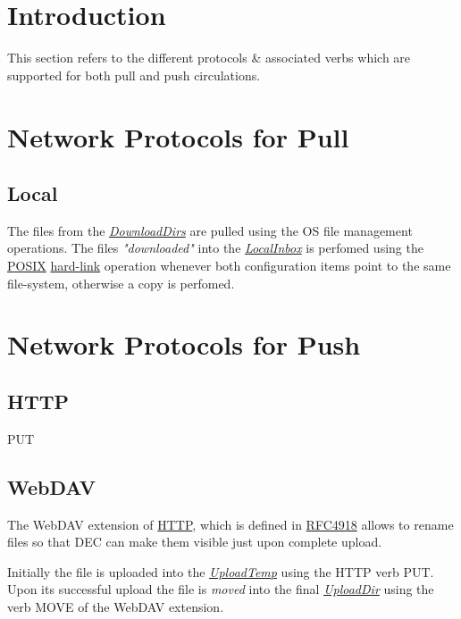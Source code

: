 \documentclass[dec_sum_main.tex]{subfiles}
\begin{document}
\section{Introduction}
This section refers to the different protocols \& associated verbs which are supported for both pull and push circulations.


\section{Network Protocols for Pull}

\subsection{Local}
The files from the \hyperref[DownloadDirs]{\textit{DownloadDirs}} are 
pulled using the OS file management operations. 
The files \textit{"downloaded"} into the \hyperref[LocalInbox]{\textit{LocalInbox}} is perfomed using the \hyperlink{https://en.wikipedia.org/wiki/POSIX}{POSIX} \hyperlink{https://en.wikipedia.org/wiki/Hard_link}{hard-link} operation whenever both configuration items point to the same file-system, otherwise a copy is perfomed.

\section{Network Protocols for Push}

\subsection{HTTP}
PUT

\subsection{WebDAV}
The WebDAV extension of \href{https://www.w3.org/Protocols/rfc2616/rfc2616-sec9.html}{HTTP}, which is defined in \href{https://tools.ietf.org/html/rfc4918}{RFC4918} allows to rename files so that DEC can make them visible just upon complete upload.

\par
\noindent
Initially the file is uploaded into the \hyperref[UploadTemp]{\textit{UploadTemp}} using the HTTP verb PUT. Upon its successful upload the file is \textit{moved} into the final \hyperref[UploadDir]{\textit{UploadDir}} using the verb MOVE of the WebDAV extension.
\end{document}
